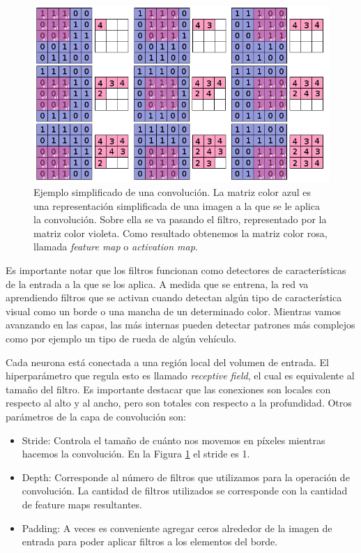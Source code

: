 \documentclass[spanish]{report}
\begin{document}
\begin{figure}[h]
\centering
 \includegraphics[width=\linewidth]{convolucion.png}
   \caption{Ejemplo simplificado de una convolución. La matriz color azul es una representación simplificada de una imagen a la que se le aplica la convolución. Sobre ella se va pasando el filtro, representado por la matriz color violeta. Como resultado obtenemos la matriz color rosa, llamada \textit{feature map} o \textit{activation map}.}
  \label{fig:convolution}
\end{figure}
\enlargethispage{0.6in}
Es importante notar que los filtros funcionan como detectores de características de la entrada a la que se los aplica. A medida que se entrena, la red va aprendiendo filtros que se activan cuando detectan algún tipo de característica visual como un borde o una mancha de un determinado color. Mientras vamos avanzando en las capas, las más internas pueden detectar patrones más complejos como por ejemplo un tipo de rueda de algún vehículo.

Cada neurona está conectada a una región local del volumen de entrada. El hiperparámetro que regula esto es llamado \textit{receptive field}, el cual es equivalente al tamaño del filtro. Es importante destacar que las conexiones son locales con respecto al alto y al ancho, pero son totales con respecto a la profundidad. Otros parámetros de la capa de convolución son:

\begin{itemize}
\item Stride: Controla el tamaño de cuánto nos movemos en píxeles mientras hacemos la convolución. En la Figura \ref{fig:convolution} el stride es 1.
\item Depth: Corresponde al número de filtros que utilizamos para la operación de convolución. La cantidad de filtros utilizados se corresponde con la cantidad de feature maps resultantes.
\item Padding: A veces es conveniente agregar ceros alrededor de la imagen de entrada para poder aplicar filtros a los elementos del borde.
\end{itemize}
\end{document}
